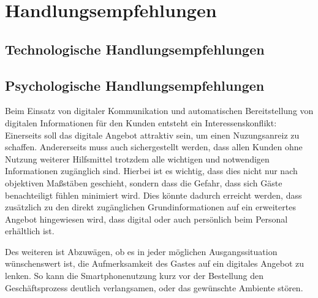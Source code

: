 

\newpage
\section{Handlungsempfehlungen} %
\label{sec:handlungsempfehlungen}

\subsection{Technologische Handlungsempfehlungen} %
\label{sub:technologische_handlungsempfehlungen}




\subsection{Psychologische Handlungsempfehlungen} %
\label{sub:psychologische_handlungsempfehlungen}
Beim Einsatz von digitaler Kommunikation und automatischen Bereitstellung von digitalen Informationen für den Kunden entsteht ein Interessenskonflikt: Einerseits soll das digitale Angebot attraktiv sein, um einen Nuzungsanreiz zu schaffen. Andererseits muss auch sichergestellt werden, dass allen Kunden ohne Nutzung weiterer Hilfsmittel trotzdem alle wichtigen und notwendigen Informationen zugänglich sind.
Hierbei ist es wichtig, dass dies nicht nur nach objektiven Maßstäben geschieht, sondern dass die Gefahr, dass sich Gäste benachteiligt fühlen minimiert wird. Dies könnte dadurch erreicht werden, dass zusätzlich zu den direkt zugänglichen Grundinformationen auf ein erweitertes Angebot hingewiesen wird, dass digital oder auch persönlich beim Personal erhältlich ist.

Des weiteren ist Abzuwägen, ob es in jeder möglichen Ausgangssituation wünschenswert ist, die Aufmerksamkeit des Gastes auf ein digitales Angebot zu lenken. So kann die Smartphonenutzung kurz vor der Bestellung den Geschäftsprozess deutlich verlangsamen, oder das gewünschte Ambiente stören. 


